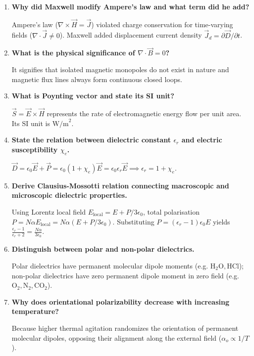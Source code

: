 \documentclass[12pt,a4paper]{article}
\newcommand{\Q}[1]{\textbf{#1}\par\noindent\ignorespaces}
\begin{document}
\begin{tcolorbox}[exambox, title={\textbf{Frequently Asked / Viva Questions}}]
\begin{enumerate}[topsep=0pt, label=\textbf{Q\arabic*.}, itemsep=5pt]
  \item \Q{Why did Maxwell modify Ampere's law and what term did he add?}
  Ampere's law ($\nabla \times \vec{H} = \vec{J}$) violated charge conservation for time-varying fields ($\nabla \cdot \vec{J} \neq 0$). Maxwell added displacement current density $\vec{J}_d = \partial\vec{D}/\partial t$.

  \item \Q{What is the physical significance of $\nabla \cdot \vec{B} = 0$?}
  It signifies that isolated magnetic monopoles do not exist in nature and magnetic flux lines always form continuous closed loops.

  \item \Q{What is Poynting vector and state its SI unit?}
  $\vec{S} = \vec{E} \times \vec{H}$ represents the rate of electromagnetic energy flow per unit area. Its SI unit is $\text{W/m}^2$.

  \item \Q{State the relation between dielectric constant $\epsilon_r$ and electric susceptibility $\chi_e$.}
  $\vec{D} = \epsilon_0 \vec{E} + \vec{P} = \epsilon_0(1 + \chi_e)\vec{E} = \epsilon_0 \epsilon_r \vec{E} \implies \epsilon_r = 1 + \chi_e$.

  \item \Q{Derive Clausius-Mossotti relation connecting macroscopic and microscopic dielectric properties.}
  Using Lorentz local field $E_{\text{local}} = E + P/3\epsilon_0$, total polarisation $P = N\alpha E_{\text{local}} = N\alpha(E + P/3\epsilon_0)$. Substituting $P = (\epsilon_r - 1)\epsilon_0 E$ yields $\frac{\epsilon_r - 1}{\epsilon_r + 2} = \frac{N\alpha}{3\epsilon_0}$.

  \item \Q{Distinguish between polar and non-polar dielectrics.}
  Polar dielectrics have permanent molecular dipole moments (e.g. $\text{H}_2\text{O}, \text{HCl}$); non-polar dielectrics have zero permanent dipole moment in zero field (e.g. $\text{O}_2, \text{N}_2, \text{CO}_2$).

  \item \Q{Why does orientational polarizability decrease with increasing temperature?}
  Because higher thermal agitation randomizes the orientation of permanent molecular dipoles, opposing their alignment along the external field ($\alpha_o \propto 1/T$).


\end{enumerate}
\end{tcolorbox}
\end{document}
